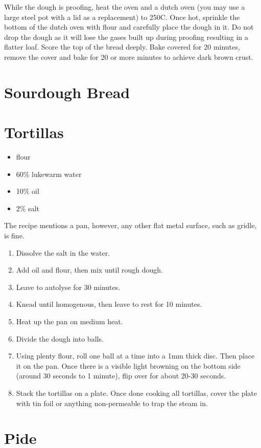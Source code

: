 While the dough is proofing, heat the oven and a dutch oven (you may use a
large steel pot with a lid as a replacement) to 250C. Once hot, sprinkle the
bottom of the dutch oven with flour and carefully place the dough in it. Do not
drop the dough as it will lose the gases built up during proofing resulting in
a flatter loaf. Score the top of the bread deeply. Bake covered for 20 minutes,
remove the cover and bake for 20 or more minutes to achieve dark brown crust.

\section{Sourdough Bread}

\section{Tortillas}
\begin{itemize}
  \item flour
  \item 60\% lukewarm water
  \item 10\% oil
  \item 2\% salt
\end{itemize}

The recipe mentions a pan, however, any other flat metal surface, such as
gridle, is fine.
\begin{enumerate}
  \item Dissolve the salt in the water.
  \item Add oil and flour, then mix until rough dough.
  \item Leave to autolyse for 30 minutes.
  \item Knead until homogenous, then leave to rest for 10 minutes.
  \item Heat up the pan on medium heat.
  \item Divide the dough into balls.
  \item Using plenty flour, roll one ball at a time into a 1mm thick disc. Then
    place it on the pan. Once there is a visible light browning on the bottom
    side (around 30 seconds to 1 minute), flip over for about 20-30 seconds.
  \item Stack the tortillas on a plate. Once done cooking all tortillas, cover
    the plate with tin foil or anything non-permeable to trap the steam in.
\end{enumerate}

\section{Pide}
